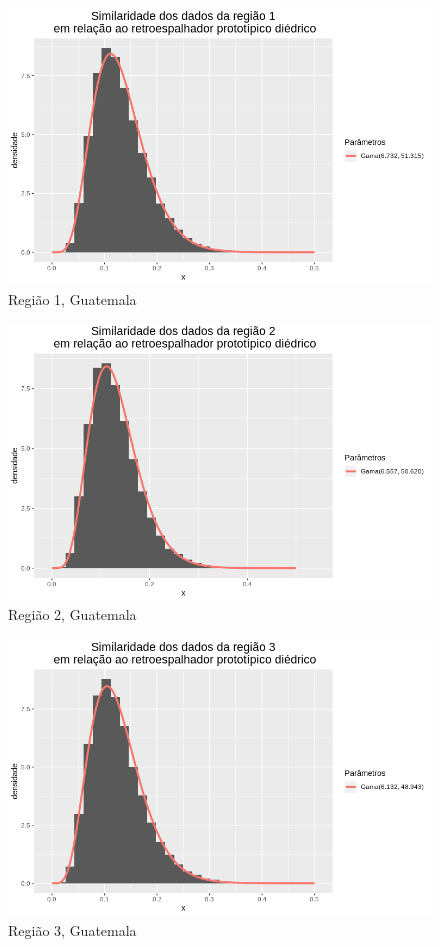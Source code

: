 \documentclass[12pt]{article}
\begin{document}
\begin{figure}[!h]
    \centering
    \includegraphics[width = 0.93\linewidth]{../../Images/Report_18_12_17/di_region1.png}
    \caption{Região 1, Guatemala}
    \label{fig:di_r1}
\end{figure}

\begin{figure}[!h]
    \centering
    \includegraphics[width = 0.93\linewidth]{../../Images/Report_18_12_17/di_region2.png}
    \caption{Região 2, Guatemala}
    \label{fig:di_r2}
\end{figure}

\begin{figure}[!h]
    \centering
    \vspace{0.1\linewidth}
    \includegraphics[width = 0.95\linewidth]{../../Images/Report_18_12_17/di_region3.png}
    \caption{Região 3, Guatemala}
    \label{fig:di_r3}
\end{figure}
\end{document}

